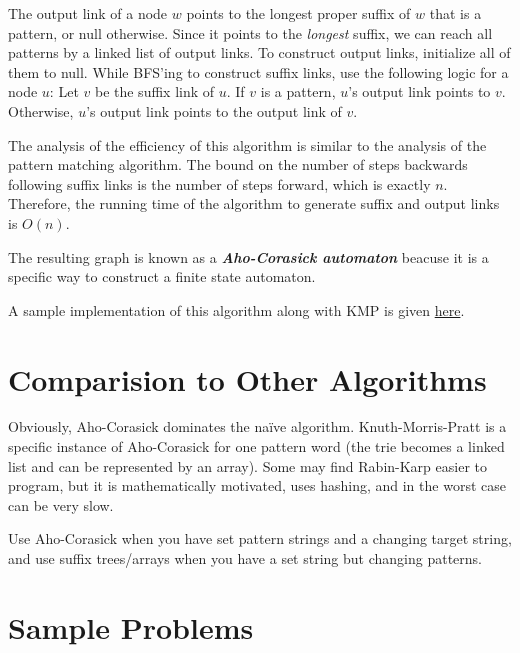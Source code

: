\documentclass[11pt, oneside]{article}
\newcommand{\emphasis}[1]{\textbf{\textit{#1}}}
\begin{document}
The output link of a node \( w \) points to the longest proper suffix of \( w \) that is a pattern,
or null otherwise. Since it points to the \textit{longest} suffix, we can reach all patterns
by a linked list of output links. To construct output links, initialize all of them to null.
While BFS'ing to construct suffix links, use the following logic for a node \( u \):
Let \( v \) be the suffix link of \( u \). If \( v \) is a pattern, \( u \)'s output link
points to \( v \). Otherwise, \( u \)'s output link points to the output link of \( v \).

The analysis of the efficiency of this algorithm is similar to the analysis of the pattern matching algorithm.
The bound on the number of steps backwards following suffix links is the number of steps forward, which is exactly \( n \).
Therefore, the running time of the algorithm to generate suffix and output links is \( O(n) \).

The resulting graph is known as a \emphasis{Aho-Corasick automaton} beacuse it is a specific way to construct
a finite state automaton.

A sample implementation of this algorithm along with KMP is given \href{https://gist.github.com/stephen-huan/aa609965c86d750736398c28b025f9be#matching}{here}.

\section{Comparision to Other Algorithms}

Obviously, Aho-Corasick dominates the naïve algorithm. Knuth-Morris-Pratt is a specific instance of
Aho-Corasick for one pattern word (the trie becomes a linked list and can be represented by an array).
Some may find Rabin-Karp easier to program, but it is mathematically motivated, uses hashing,
and in the worst case can be very slow.

Use Aho-Corasick when you have set pattern strings and a changing target string,
and use suffix trees/arrays when you have a set string but changing patterns.

\newpage

\section{Sample Problems}
\end{document}
